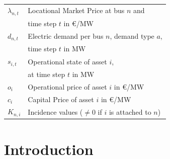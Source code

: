\documentclass[11pt,twocolumn]{article}
\newcommand{\vpad}{\vspace{1mm}}
\newcommand{\state}[1][i]{s_{#1,t}}
\newcommand{\generation}{g_{s,t}}
\newcommand{\capacitygeneration}{G_{s}}
\newcommand{\flow}{f_{\ell,t}}
\newcommand{\capacityflow}{F_{\ell}}
\newcommand{\lmp}[1][n]{\lambda_{#1,t}}
\newcommand{\demand}[1][n]{d_{#1,t}}
\newcommand{\incidenceasset}[1][n]{K_{#1,i}}
\begin{document}
\begin{table}[h]
    \centering
    \begin{tabular}{ll}
        $\lmp$ & Locational Market Price at bus $n$ and  \\ & time step $t$ in \euro/MW \vpad \\
        $\demand$ & Electric demand per bus $n$, demand type $a$, \\ & time step $t$ in MW  \vpad \\
        $\state$ & Operational state of asset $i$, \\ & at time step $t$  in MW \vpad \\
        $o_i$ & Operational price of asset $i$ in \euro/MW \vpad \\
        $c_i$ & Capital Price of asset $i$ in \euro/MW \vpad \\
        $\incidenceasset$ & Incidence values ($\ne$0  if $i$ is attached to $n$)  \vpad 
    \end{tabular}
\end{table}

\section{Introduction}
\end{document}
